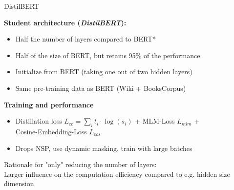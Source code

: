 \documentclass[]{beamer}
\begin{document}
\begin{frame}{DistilBERT \href{https://arxiv.org/pdf/1910.01108.pdf}{}}

\textbf{Student architecture (\textit{DistilBERT}):}

\begin{itemize}
	\item Half the number of layers compared to BERT*
 	\item Half of the size of BERT, but retains 95\% of the performance
	\item Initialize from BERT (taking one out of two hidden layers)
	\item Same pre-training data as BERT (Wiki + BooksCorpus)
\end{itemize}

\vspace{.3cm}

\textbf{Training and performance}

\begin{itemize}
	\item Distillation loss $L_{ce} = \sum_i t_i \cdot \log(s_i)$ + MLM-Loss $L_{mlm}$ + \\
				Cosine-Embedding-Loss $L_{cos}$
	\item Drops NSP, use dynamic masking, train with large batches
\end{itemize}

\vspace{1cm}

{\footnotesize *Rationale for "only" reducing the number of layers:\\
Larger influence on the computation efficiency compared to e.g. hidden size dimension}
	
\end{frame}
\end{document}
